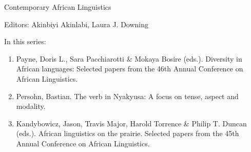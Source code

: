 {\large Contemporary African Linguistics}

\bigskip

Editors: Akinbiyi Akinlabi,  Laura J. Downing  


\bigskip

In this series:

\begin{enumerate}
\item Payne, Doris L., Sara Pacchiarotti \& Mokaya Bosire (eds.). Diversity in African languages: Selected papers from the 46th Annual Conference on African Linguistics.
\item Persohn, Bastian. The verb in Nyakyusa: A focus on tense, aspect and modality.
\item Kandybowicz, Jason, Travis Major, Harold Torrence \& Philip T. Duncan (eds.). African linguistics on the prairie. Selected papers from the 45th Annual Conference on African Linguistics.
\end{enumerate}


\vfill

